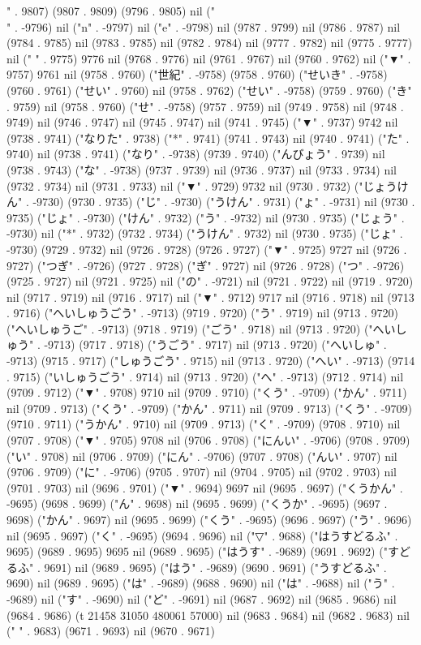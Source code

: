 " . 9807) (9807 . 9809) (9796 . 9805) nil ("\\" . -9796) nil ("n" . -9797) nil ("e" . -9798) nil (9787 . 9799) nil (9786 . 9787) nil (9784 . 9785) nil (9783 . 9785) nil (9782 . 9784) nil (9777 . 9782) nil (9775 . 9777) nil (" " . 9775) 9776 nil (9768 . 9776) nil (9761 . 9767) nil (9760 . 9762) nil ("▼" . 9757) 9761 nil (9758 . 9760) ("世紀" . -9758) (9758 . 9760) ("せいき" . -9758) (9760 . 9761) ("せい" . 9760) nil (9758 . 9762) ("せい" . -9758) (9759 . 9760) ("き" . 9759) nil (9758 . 9760) ("せ" . -9758) (9757 . 9759) nil (9749 . 9758) nil (9748 . 9749) nil (9746 . 9747) nil (9745 . 9747) nil (9741 . 9745) ("▼" . 9737) 9742 nil (9738 . 9741) ("なりた" . 9738) ("*" . 9741) (9741 . 9743) nil (9740 . 9741) ("た" . 9740) nil (9738 . 9741) ("なり" . -9738) (9739 . 9740) ("んびょう" . 9739) nil (9738 . 9743) ("な" . -9738) (9737 . 9739) nil (9736 . 9737) nil (9733 . 9734) nil (9732 . 9734) nil (9731 . 9733) nil ("▼" . 9729) 9732 nil (9730 . 9732) ("じょうけん" . -9730) (9730 . 9735) ("じ" . -9730) ("うけん" . 9731) ("ょ" . -9731) nil (9730 . 9735) ("じょ" . -9730) ("けん" . 9732) ("う" . -9732) nil (9730 . 9735) ("じょう" . -9730) nil ("*" . 9732) (9732 . 9734) ("うけん" . 9732) nil (9730 . 9735) ("じょ" . -9730) (9729 . 9732) nil (9726 . 9728) (9726 . 9727) ("▼" . 9725) 9727 nil (9726 . 9727) ("つぎ" . -9726) (9727 . 9728) ("ぎ" . 9727) nil (9726 . 9728) ("つ" . -9726) (9725 . 9727) nil (9721 . 9725) nil ("の" . -9721) nil (9721 . 9722) nil (9719 . 9720) nil (9717 . 9719) nil (9716 . 9717) nil ("▼" . 9712) 9717 nil (9716 . 9718) nil (9713 . 9716) ("へいしゅうごう" . -9713) (9719 . 9720) ("う" . 9719) nil (9713 . 9720) ("へいしゅうご" . -9713) (9718 . 9719) ("ごう" . 9718) nil (9713 . 9720) ("へいしゅう" . -9713) (9717 . 9718) ("うごう" . 9717) nil (9713 . 9720) ("へいしゅ" . -9713) (9715 . 9717) ("しゅうごう" . 9715) nil (9713 . 9720) ("へい" . -9713) (9714 . 9715) ("いしゅうごう" . 9714) nil (9713 . 9720) ("へ" . -9713) (9712 . 9714) nil (9709 . 9712) ("▼" . 9708) 9710 nil (9709 . 9710) ("くう" . -9709) ("かん" . 9711) nil (9709 . 9713) ("くう" . -9709) ("かん" . 9711) nil (9709 . 9713) ("くう" . -9709) (9710 . 9711) ("うかん" . 9710) nil (9709 . 9713) ("く" . -9709) (9708 . 9710) nil (9707 . 9708) ("▼" . 9705) 9708 nil (9706 . 9708) ("にんい" . -9706) (9708 . 9709) ("い" . 9708) nil (9706 . 9709) ("にん" . -9706) (9707 . 9708) ("んい" . 9707) nil (9706 . 9709) ("に" . -9706) (9705 . 9707) nil (9704 . 9705) nil (9702 . 9703) nil (9701 . 9703) nil (9696 . 9701) ("▼" . 9694) 9697 nil (9695 . 9697) ("くうかん" . -9695) (9698 . 9699) ("ん" . 9698) nil (9695 . 9699) ("くうか" . -9695) (9697 . 9698) ("かん" . 9697) nil (9695 . 9699) ("くう" . -9695) (9696 . 9697) ("う" . 9696) nil (9695 . 9697) ("く" . -9695) (9694 . 9696) nil ("▽" . 9688) ("はうすどるふ" . 9695) (9689 . 9695) 9695 nil (9689 . 9695) ("はうす" . -9689) (9691 . 9692) ("すどるふ" . 9691) nil (9689 . 9695) ("はう" . -9689) (9690 . 9691) ("うすどるふ" . 9690) nil (9689 . 9695) ("は" . -9689) (9688 . 9690) nil ("は" . -9688) nil ("う" . -9689) nil ("す" . -9690) nil ("ど" . -9691) nil (9687 . 9692) nil (9685 . 9686) nil (9684 . 9686) (t 21458 31050 480061 57000) nil (9683 . 9684) nil (9682 . 9683) nil (" " . 9683) (9671 . 9693) nil (9670 . 9671) 